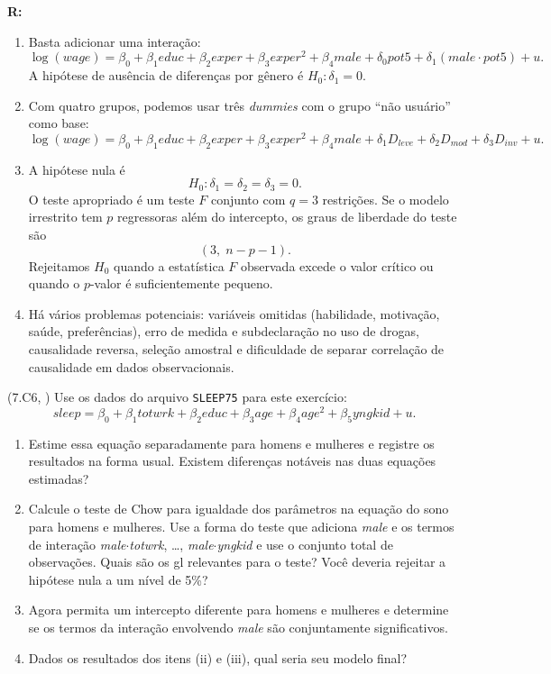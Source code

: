 \documentclass[12pt,letterpaper, onecolumn]{exam}
\renewenvironment{solution}
{\par\noindent\textbf{R:}\enspace\color{blue}}
{\par\color{black}}
\begin{document}
\begin{questions}
\begin{solution}
\begin{enumerate}[label=(\roman*)]
    \item Basta adicionar uma interação:
    \[
    \log(wage)=\beta_0+\beta_1 educ+\beta_2 exper+\beta_3 exper^2+\beta_4 male+\delta_0 pot5+\delta_1(male\cdot pot5)+u.
    \]
    A hipótese de ausência de diferenças por gênero é \(H_0:\delta_1=0\).

    \item Com quatro grupos, podemos usar três \textit{dummies} com o grupo ``não usuário'' como base:
    \[
    \log(wage)=\beta_0+\beta_1 educ+\beta_2 exper+\beta_3 exper^2+\beta_4 male+\delta_1 D_{leve}+\delta_2 D_{mod}+\delta_3 D_{inv}+u.
    \]

    \item A hipótese nula é
    \[
    H_0:\delta_1=\delta_2=\delta_3=0.
    \]
    O teste apropriado é um teste \(F\) conjunto com \(q=3\) restrições. Se o modelo irrestrito tem \(p\) regressoras além do intercepto, os graus de liberdade do teste são
    \[
    (3,\; n-p-1).
    \]
    Rejeitamos \(H_0\) quando a estatística \(F\) observada excede o valor crítico ou quando o \(p\)-valor é suficientemente pequeno.

    \item Há vários problemas potenciais: variáveis omitidas (habilidade, motivação, saúde, preferências), erro de medida e subdeclaração no uso de drogas, causalidade reversa, seleção amostral e dificuldade de separar correlação de causalidade em dados observacionais.
\end{enumerate}
\end{solution}

\vspace{0.7cm}

\question\qstar (7.C6, \citep{wooldridge2016}) Use os dados do arquivo \texttt{SLEEP75} para este exercício:
\[
sleep = \beta_0 + \beta_1 totwrk + \beta_2 educ + \beta_3 age + \beta_4 age^2 + \beta_5 yngkid + u.
\]
\begin{enumerate}[label=(\roman*)]
    \item Estime essa equação separadamente para homens e mulheres e registre os resultados na forma usual. Existem diferenças notáveis nas duas equações estimadas?
    \item Calcule o teste de Chow para igualdade dos parâmetros na equação do sono para homens e mulheres. Use a forma do teste que adiciona \textit{male} e os termos de interação \textit{male}$\cdot$\textit{totwrk}, \ldots, \textit{male}$\cdot$\textit{yngkid} e use o conjunto total de observações. Quais são os gl relevantes para o teste? Você deveria rejeitar a hipótese nula a um nível de 5\%?
    \item Agora permita um intercepto diferente para homens e mulheres e determine se os termos da interação envolvendo \textit{male} são conjuntamente significativos.
    \item Dados os resultados dos itens (ii) e (iii), qual seria seu modelo final?
\end{enumerate}

\end{questions}


\end{document}

